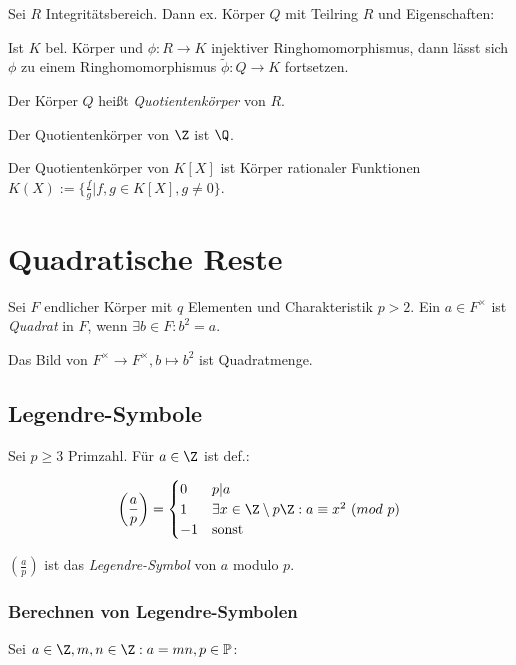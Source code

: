 Sei $R$ Integritätsbereich. Dann ex. Körper $Q$ mit Teilring $R$ und Eigenschaften:

Ist $K$ bel. Körper und $\phi : R \to K$ injektiver Ringhomomorphismus, dann lässt sich $\phi$ zu einem Ringhomomorphismus $\tilde\phi : Q \to K$ fortsetzen.

Der Körper $Q$ heißt \emph{Quotientenkörper} von $R$.

\vspace*{2mm}

Der Quotientenkörper von $\Z$ ist $\Q$.

Der Quotientenkörper von $K[X]$ ist Körper rationaler Funktionen $K(X) := \{ \frac{f}{g} | f, g \in K[X], g \neq 0 \}$.

\section*{Quadratische Reste}

Sei $F$ endlicher Körper mit $q$ Elementen und Charakteristik $p > 2$. Ein $a \in F^\times$ ist \emph{Quadrat} in $F$, wenn $\exists b \in F : b^2 = a$.

Das Bild von $F^\times \to F^\times, b \mapsto b^2$ ist Quadratmenge.

\subsection*{Legendre-Symbole}

\newcommand{\legendre}[2]{\left(\frac{#1}{#2}\right)}

Sei $p \geq 3$ Primzahl. Für $a \in \Z$ ist def.:

\vspace*{-2mm}
$$\legendre{a}{p} = \begin{cases}
	0  & p | a \\
	1  & \exists x \in \Z \setminus p\Z : a \equiv x^2 \ (mod \ p) \\
	-1 & \text{sonst}
\end{cases}$$

$\legendre{a}{p}$ ist das \emph{Legendre-Symbol} von $a$ modulo $p$.

\pagebreak

\subsubsection*{Berechnen von Legendre-Symbolen}

Sei $a \in \Z, m, n \in \Z : a=mn, p \in \Primes$:

